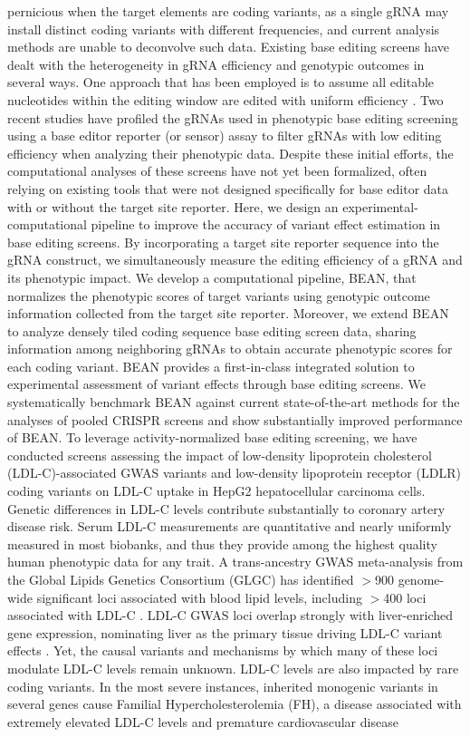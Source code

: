 \documentclass[a4paper, titlepage, openright]{book}
\begin{document}
pernicious when the target elements are coding variants, as a single gRNA may install distinct coding variants with different frequencies, and current analysis methods are unable to deconvolve such data.  Existing base editing screens have dealt with the heterogeneity in gRNA efficiency and genotypic outcomes in several ways. One approach that has been employed is to assume all editable nucleotides within the editing window are edited with uniform efficiency \citep{hanna2021massively}. Two recent studies have profiled the gRNAs used in phenotypic base editing screening using a base editor reporter (or sensor) assay \citep{sanchez2022base, kim2022high} to filter gRNAs with low editing efficiency when analyzing their phenotypic data. Despite these initial efforts, the computational analyses of these screens have not yet been formalized, often relying on existing tools that were not designed specifically for base editor data with or without the target site reporter. Here, we design an experimental-computational pipeline to improve the accuracy of variant effect estimation in base editing screens. By incorporating a target site reporter sequence into the gRNA construct, we simultaneously measure the editing efficiency of a gRNA and its phenotypic impact. We develop a computational pipeline, BEAN, that normalizes the phenotypic scores of target variants using genotypic outcome information collected from the target site reporter. Moreover, we extend BEAN to analyze densely tiled coding sequence base editing screen data, sharing information among neighboring gRNAs to obtain accurate phenotypic scores for each coding variant. BEAN provides a first-in-class integrated solution to experimental assessment of variant effects through base editing screens. We systematically benchmark BEAN against current state-of-the-art methods for the analyses of pooled CRISPR screens and show substantially improved performance of BEAN. To leverage activity-normalized base editing screening, we have conducted screens assessing the impact of low-density lipoprotein cholesterol (LDL-C)-associated GWAS variants and low-density lipoprotein receptor (LDLR) coding variants on LDL-C uptake in HepG2 hepatocellular carcinoma cells. Genetic differences in LDL-C levels contribute substantially to coronary artery disease risk. Serum LDL-C measurements are quantitative and nearly uniformly measured in most biobanks, and thus they provide among the highest quality human phenotypic data for any trait. A trans-ancestry GWAS meta-analysis from the Global Lipids Genetics Consortium (GLGC) has identified $>$900 genome-wide significant loci associated with blood lipid levels, including $>$400 loci associated with LDL-C \citep{graham2021power}. LDL-C GWAS loci overlap strongly with liver-enriched gene expression, nominating liver as the primary tissue driving LDL-C variant effects \citep{wang2022epic, finucane2018heritability}. Yet, the causal variants and mechanisms by which many of these loci modulate LDL-C levels remain unknown.  LDL-C levels are also impacted by rare coding variants. In the most severe instances, inherited monogenic variants in several genes cause Familial Hypercholesterolemia (FH), a disease associated with extremely elevated LDL-C levels and premature cardiovascular disease 
\end{document}
